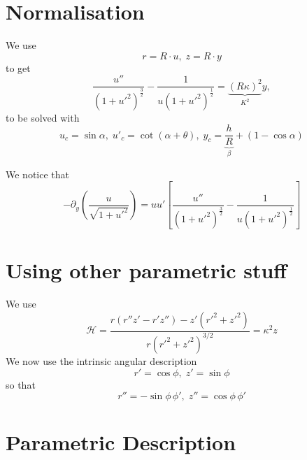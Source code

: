 \documentclass[aps,onecolumn]{revtex4}
\begin{document}
\section{Normalisation}
We use
\begin{equation}
	r = R\cdot u,\; z = R \cdot y
\end{equation}
to get
\begin{equation}
	\dfrac{u''}{\left(1+{u'}^2\right)^{\frac{3}{2}}} - \dfrac{1}{u\left(1+{u'}^2\right)^{\frac{1}{2}}} = \underbrace{\left(R\kappa\right)^2}_{K^2} y,
\end{equation}
to be solved with
\begin{equation}
	u_c = \sin\alpha, \; u'_c = \cot\left(\alpha+\theta\right), \; y_c = \underbrace{\dfrac{h}{R}}_{\beta} + \left(1-\cos\alpha\right)
\end{equation}

We notice that
\begin{equation}
	- \partial_y \left(\dfrac{u}{\sqrt{1+{u'}^2}}\right) = u u' \left[ \dfrac{u''}{\left(1+{u'}^2\right)^{\frac{3}{2}}} - \dfrac{1}{u\left(1+{u'}^2\right)^{\frac{1}{2}}} \right]
\end{equation}


\section{Using other parametric stuff}
We use
\begin{equation}
	\mathcal{H} =  \dfrac{
		r \left(r''z'-r'z''\right)  - z' \left(r'^2+z'^2\right)
	}
	{
		r\left(r'^2+z'^2\right)^{3/2}
	} = \kappa^2 z
\end{equation}
We now use the intrinsic angular description 
\begin{equation}
	r' = \cos \phi,\; z' = \sin \phi
\end{equation}
so that
\begin{equation}
	r'' = -\sin \phi\, \phi',\; z'' = \cos \phi \, \phi'
\end{equation}


\section{Parametric Description}
\end{document}
